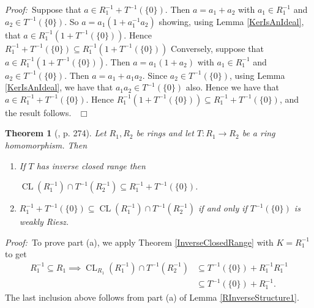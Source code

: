 \documentclass[12pt, oneside]{book}
\newtheorem{theorem}{Theorem}[subsection]
\newcommand{\proof}{{\noindent \it Proof:~}}
\newcommand{\qed}{\hfill ~$\Box$\\}
\def\CL{\operatorname{CL}}
\begin{document}
\proof \space Suppose that $a \in R_1^{-1}+T^{-1}(\{0\})$. Then $a=a_1+a_2$ with $a_1 \in R_1^{-1}$ 
and $a_2 \in T^{-1}(\{0\})$. So $a=a_1(1+a_1^{-1}a_2)$ showing, using Lemma \ref{KerIsAnIdeal}, 
that $a \in R_1^{-1}(1+T^{-1}(\{0\}))$.  Hence 
$R_1^{-1} + T^{-1}(\{0\}) \subseteq R_1^{-1}(1+T^{-1}(\{0\}))$
\vskip 0.3cm
\noindent Conversely, suppose that $a \in R_1^{-1}(1+T^{-1}(\{0\}))$. Then $a=a_1(1+a_2)$ with 
$a_1 \in R_1^{-1}$ and $a_2 \in T^{-1}(\{0\})$. Then $a=a_1+a_1a_2$. Since $a_2 \in T^{-1}(\{0\})$, 
using Lemma \ref{KerIsAnIdeal}, we have that $a_1a_2 \in T^{-1}(\{0\}) $ also.  Hence we have that 
$a \in R_1^{-1}+T^{-1}(\{0\})$. Hence $R_1^{-1}(1+T^{-1}(\{0\})) \subseteq R_1^{-1} + T^{-1}(\{0\})$, 
and the result follows. \qed

\begin{theorem}[\cite{CH3}, p. 274] 
\normalfont
\noindent Let $R_1, R_2$ be rings and let $T:R_1 \to R_2$ be a ring homomorphism. Then
\begin{enumerate}[label=(\alph*)]
\item If $T$ has inverse closed range then
\begin{center}
$\CL(R_1^{-1}) \cap T^{-1}(R_2^{-1}) \subseteq R_1^{-1}+T^{-1}(\{0\})$.
\end{center}
\item  $R_1^{-1}+T^{-1}(\{0\}) \subseteq \CL(R_1^{-1}) \cap T^{-1}(R_2^{-1})$ if and only if $T^{-1}(\{0\})$ is weakly Riesz.

\end{enumerate}
\end{theorem}

\proof \space To prove part (a), we apply Theorem \ref{InverseClosedRange} with $K=R_1^{-1}$ to get
\begin{align*}
R_1^{-1} \subseteq R_1 \implies \CL_{R_1}(R_1^{-1}) \cap T^{-1}(R_2^{-1}) 
&\subseteq T^{-1}(\{0\}) + R_1^{-1}R_1^{-1} \\
&\subseteq T^{-1}(\{0\}) + R_1^{-1}.
\end{align*}
The last inclusion above follows from part (a) of Lemma \ref{RInverseStructure1}.
\vskip 0.3cm
\end{document}

